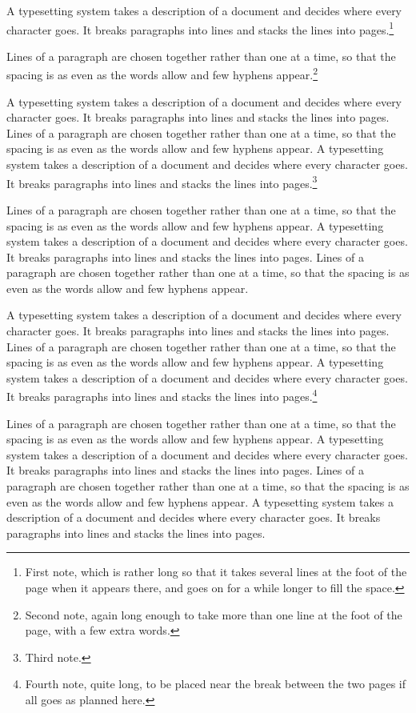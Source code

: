 \documentclass{article}
\begin{document}
A typesetting system takes a description of a document and decides where every character goes. It breaks paragraphs into lines and stacks the lines into pages.\footnote{First note, which is rather long so that it takes several lines at the foot of the page when it appears there, and goes on for a while longer to fill the space.}

Lines of a paragraph are chosen together rather than one at a time, so that the spacing is as even as the words allow and few hyphens appear.\footnote{Second note, again long enough to take more than one line at the foot of the page, with a few extra words.}

A typesetting system takes a description of a document and decides where every character goes. It breaks paragraphs into lines and stacks the lines into pages. Lines of a paragraph are chosen together rather than one at a time, so that the spacing is as even as the words allow and few hyphens appear. A typesetting system takes a description of a document and decides where every character goes. It breaks paragraphs into lines and stacks the lines into pages.\footnote{Third note.}

Lines of a paragraph are chosen together rather than one at a time, so that the spacing is as even as the words allow and few hyphens appear. A typesetting system takes a description of a document and decides where every character goes. It breaks paragraphs into lines and stacks the lines into pages. Lines of a paragraph are chosen together rather than one at a time, so that the spacing is as even as the words allow and few hyphens appear.

A typesetting system takes a description of a document and decides where every character goes. It breaks paragraphs into lines and stacks the lines into pages. Lines of a paragraph are chosen together rather than one at a time, so that the spacing is as even as the words allow and few hyphens appear. A typesetting system takes a description of a document and decides where every character goes. It breaks paragraphs into lines and stacks the lines into pages.\footnote{Fourth note, quite long, to be placed near the break between the two pages if all goes as planned here.}

Lines of a paragraph are chosen together rather than one at a time, so that the spacing is as even as the words allow and few hyphens appear. A typesetting system takes a description of a document and decides where every character goes. It breaks paragraphs into lines and stacks the lines into pages. Lines of a paragraph are chosen together rather than one at a time, so that the spacing is as even as the words allow and few hyphens appear. A typesetting system takes a description of a document and decides where every character goes. It breaks paragraphs into lines and stacks the lines into pages.
\end{document}
